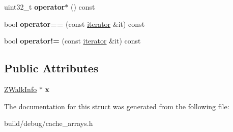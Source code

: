 \begin{DoxyCompactItemize}
\item 
\hypertarget{structZCands_1_1iterator_a93386f66f4e54d43b4176b95687a37fa}{uint32\-\_\-t {\bfseries operator$\ast$} () const }\label{structZCands_1_1iterator_a93386f66f4e54d43b4176b95687a37fa}

\item 
\hypertarget{structZCands_1_1iterator_a0a5289939bdd7ecb218004dc120018d0}{bool {\bfseries operator==} (const \hyperlink{structZCands_1_1iterator}{iterator} \&it) const }\label{structZCands_1_1iterator_a0a5289939bdd7ecb218004dc120018d0}

\item 
\hypertarget{structZCands_1_1iterator_a2186c9225865a44ee9fd447edbef860b}{bool {\bfseries operator!=} (const \hyperlink{structZCands_1_1iterator}{iterator} \&it) const }\label{structZCands_1_1iterator_a2186c9225865a44ee9fd447edbef860b}

\end{DoxyCompactItemize}
\subsection*{Public Attributes}
\begin{DoxyCompactItemize}
\item 
\hypertarget{structZCands_1_1iterator_a8167a6aa13fe3f88a70b1fcf09be79d1}{\hyperlink{structZWalkInfo}{Z\-Walk\-Info} $\ast$ {\bfseries x}}\label{structZCands_1_1iterator_a8167a6aa13fe3f88a70b1fcf09be79d1}

\end{DoxyCompactItemize}


The documentation for this struct was generated from the following file\-:\begin{DoxyCompactItemize}
\item 
build/debug/cache\-\_\-arrays.\-h\end{DoxyCompactItemize}
